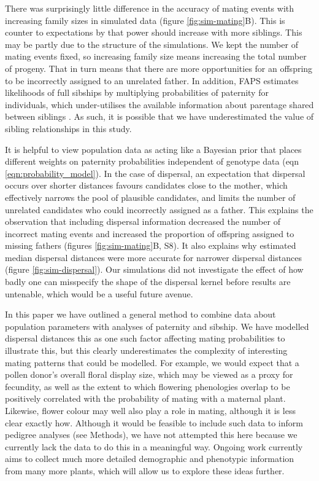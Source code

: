 \documentclass[10pt, a4paper, twocolumn]{article} %
\begin{document}
There was surprisingly little difference in the accuracy of mating events with increasing family sizes in simulated data (figure \ref{fig:sim-mating}B).
This is counter to expectations by \cite{wang2007parentage} that power should increase with more siblings.
This may be partly due to the structure of the simulations.
We kept the number of mating events fixed, so increasing family size means increasing the total number of progeny.
That in turn means that there are more opportunities for an offspring to be incorrectly assigned to an unrelated father.
In addition, FAPS estimates likelihoods of full sibships by multiplying probabilities of paternity for individuals, which under-utilises the available information about parentage shared between siblings \citep{thompson1987parental}.
As such, it is possible that we have underestimated the value of sibling relationships in this study.

It is helpful to view population data as acting like a Bayesian prior that places different weights on paternity probabilities independent of genotype data (eqn \ref{eqn:probability_model}).
In the case of dispersal, an expectation that dispersal occurs over shorter distances favours candidates close to the mother, which effectively narrows the pool of plausible candidates, and limits the number of unrelated candidates who could incorrectly assigned as a father.
This explains the observation that including dispersal information decreased the number of incorrect mating events and increased the proportion of offspring assigned to missing fathers (figures \ref{fig:sim-mating}B, S8).
It also explains why estimated median dispersal distances were more accurate for narrower dispersal distances (figure \ref{fig:sim-dispersal}).
Our simulations did not investigate the effect of how badly one can misspecify the shape of the dispersal kernel before results are untenable, which would be a useful future avenue.

In this paper we have outlined a general method to combine data about population parameters with analyses of paternity and sibship.
We have modelled dispersal distances this as one such factor affecting mating probabilities to illustrate this, but this clearly underestimates the complexity of interesting mating patterns that could be modelled.
For example, we would expect that a pollen donor's overall floral display size, which may be viewed as a proxy for fecundity, as well as the extent to which flowering phenologies overlap to be positively correlated with the probability of mating with a maternal plant.
Likewise, flower colour may well also play a role in mating, although it is less clear exactly how.
Although it would be feasible to include such data to inform pedigree analyses (see Methods), we have not attempted this here because we currently lack the data to do this in a meaningful way.
Ongoing work currently aims to collect much more detailed demographic and phenotypic information from many more plants, which will allow us to explore these ideas further.
\end{document}
